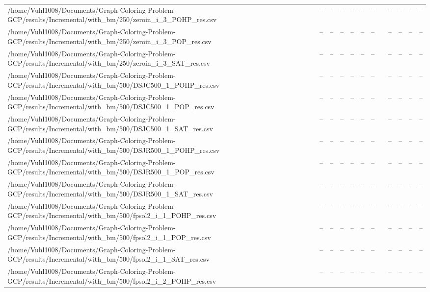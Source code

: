 \begin{table}[htbp]
\begin{tabular}{llllllllllll}
/home/Vuhl1008/Documents/Graph-Coloring-Problem-GCP/results/Incremental/with\_bm/250/zeroin\_i\_3\_POHP\_res.csv & -- & -- & -- & -- & -- & -- & {} & -- & -- & -- & -- \\
/home/Vuhl1008/Documents/Graph-Coloring-Problem-GCP/results/Incremental/with\_bm/250/zeroin\_i\_3\_POP\_res.csv & -- & -- & -- & -- & -- & -- & {} & -- & -- & -- & -- \\
/home/Vuhl1008/Documents/Graph-Coloring-Problem-GCP/results/Incremental/with\_bm/250/zeroin\_i\_3\_SAT\_res.csv & -- & -- & -- & -- & -- & -- & {} & -- & -- & -- & -- \\
/home/Vuhl1008/Documents/Graph-Coloring-Problem-GCP/results/Incremental/with\_bm/500/DSJC500\_1\_POHP\_res.csv & -- & -- & -- & -- & -- & -- & {} & -- & -- & -- & -- \\
/home/Vuhl1008/Documents/Graph-Coloring-Problem-GCP/results/Incremental/with\_bm/500/DSJC500\_1\_POP\_res.csv & -- & -- & -- & -- & -- & -- & {} & -- & -- & -- & -- \\
/home/Vuhl1008/Documents/Graph-Coloring-Problem-GCP/results/Incremental/with\_bm/500/DSJC500\_1\_SAT\_res.csv & -- & -- & -- & -- & -- & -- & {} & -- & -- & -- & -- \\
/home/Vuhl1008/Documents/Graph-Coloring-Problem-GCP/results/Incremental/with\_bm/500/DSJR500\_1\_POHP\_res.csv & -- & -- & -- & -- & -- & -- & {} & -- & -- & -- & -- \\
/home/Vuhl1008/Documents/Graph-Coloring-Problem-GCP/results/Incremental/with\_bm/500/DSJR500\_1\_POP\_res.csv & -- & -- & -- & -- & -- & -- & {} & -- & -- & -- & -- \\
/home/Vuhl1008/Documents/Graph-Coloring-Problem-GCP/results/Incremental/with\_bm/500/DSJR500\_1\_SAT\_res.csv & -- & -- & -- & -- & -- & -- & {} & -- & -- & -- & -- \\
/home/Vuhl1008/Documents/Graph-Coloring-Problem-GCP/results/Incremental/with\_bm/500/fpsol2\_i\_1\_POHP\_res.csv & -- & -- & -- & -- & -- & -- & {} & -- & -- & -- & -- \\
/home/Vuhl1008/Documents/Graph-Coloring-Problem-GCP/results/Incremental/with\_bm/500/fpsol2\_i\_1\_POP\_res.csv & -- & -- & -- & -- & -- & -- & {} & -- & -- & -- & -- \\
/home/Vuhl1008/Documents/Graph-Coloring-Problem-GCP/results/Incremental/with\_bm/500/fpsol2\_i\_1\_SAT\_res.csv & -- & -- & -- & -- & -- & -- & {} & -- & -- & -- & -- \\
/home/Vuhl1008/Documents/Graph-Coloring-Problem-GCP/results/Incremental/with\_bm/500/fpsol2\_i\_2\_POHP\_res.csv & -- & -- & -- & -- & -- & -- & {} & -- & -- & -- & -- \\

\end{tabular}
\end{table}
